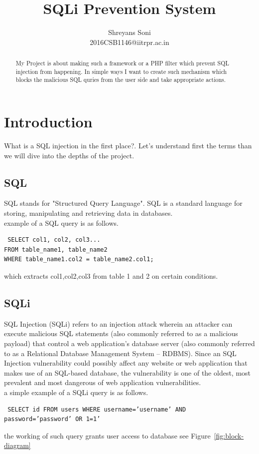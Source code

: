 \documentclass[journal]{IEEEtran}
\begin{document}
\title{SQLi Prevention System}
\author{

Shreyans Soni\\
2016CSB1146@iitrpr.ac.in

}

\maketitle
\begin{abstract}
 My Project is about making such a framework or a PHP filter which prevent SQL injection from happening. In simple ways I want to create such mechanism which blocks the malicious SQL quries from the user side and take appropriate actions. 

\end{abstract}

\section{Introduction}
  What is a SQL injection in the first place?.
  Let's understand first the terms than we will dive into the depths of the project.
\subsection{SQL}
 SQL stands for "Structured Query Language".
 SQL is a standard language for storing, manipulating and retrieving data in databases.\\
 example of a SQL query is as follows.
 \begin{lstlisting}
 SELECT col1, col2, col3...
FROM table_name1, table_name2 
WHERE table_name1.col2 = table_name2.col1;
 \end{lstlisting}
 which extracts col1,col2,col3 from table 1 and 2 on certain conditions.
\subsection{SQLi}
 SQL Injection (SQLi) refers to an injection attack wherein an attacker can execute malicious SQL statements (also commonly referred to as a malicious payload) that control a web application’s database server (also commonly referred to as a Relational Database Management System – RDBMS). Since an SQL Injection vulnerability could possibly affect any website or web application that makes use of an SQL-based database, the vulnerability is one of the oldest, most prevalent and most dangerous of web application vulnerabilities.\\
 a simple example of a SQLi query is as follows.
 \begin{lstlisting}
 SELECT id FROM users WHERE username=’username’ AND password=’password’ OR 1=1’
 \end{lstlisting}
 the working of such query grants user access to database see Figure~\ref{fig:block-diagram}
 
\end{document}
